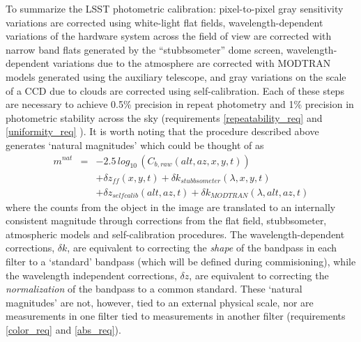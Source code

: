 \documentclass[12pt,preprint]{aastex}
\begin{document}
To summarize the LSST photometric calibration: pixel-to-pixel gray sensitivity variations are corrected
using white-light flat fields, wavelength-dependent
variations of the hardware system across the field of view are
corrected with narrow band flats generated by the ``stubbsometer''
dome screen, wavelength-dependent variations due to the atmosphere are
corrected with MODTRAN models generated using the auxiliary telescope,
and gray variations on the scale of a CCD due to clouds are corrected
using self-calibration. Each of these steps are necessary to achieve
0.5\% precision in repeat photometry and 1\% precision in photometric
stability across the sky (requirements \ref{repeatability_req} and
\ref{uniformity_req} ). It is worth noting that the procedure
described above generates `natural magnitudes' which could be thought
of as 
\begin{eqnarray}
\label{eqn:natmags}
m^{nat} & = &-2.5 \, log_{10} \, (C_{b, raw}(alt,az,x,y,t))  \\ 
 & & + \delta z_{ff}(x,y,t) + \delta k_{stubbsometer}(\lambda,x,y,t)  \nonumber \\  
 & &+ \delta z_{selfcalib}(alt,az,t)  + \delta
 k_{MODTRAN}(\lambda,alt,az,t)  \nonumber
\end{eqnarray}
where the counts from the object in the image are translated to an internally consistent magnitude
through corrections from the flat field, stubbsometer, atmospheric models and
self-calibration procedures. The wavelength-dependent corrections,
$\delta k$, are equivalent to correcting the {\it shape} of the
bandpass in each filter to a `standard' bandpass (which will be
defined during commisioning), while the wavelength independent
corrections, $\delta z$, are equivalent to correcting the {\it
normalization} of the bandpass to a common standard.  These `natural
magnitudes' are not, however, tied to an external physical scale, nor
are measurements in one filter tied to measurements in another filter
(requirements \ref{color_req} and \ref{abs_req}).  
\end{document}
